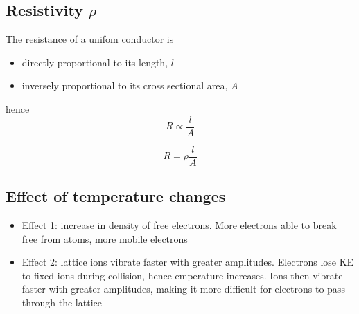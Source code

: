 \documentclass[a4paper, 10pt]{article}
\begin{document}
\subsection{Resistivity $\rho$}
The resistance of a unifom conductor is 
\begin{itemize}
   \item directly proportional to its length, $l$ 
   \item inversely proportional to its cross sectional area, $A$ 
\end{itemize}	

hence \[
R \propto \frac{l}{A}
\]

\[
R = \rho \frac{l}{A}
\]

\subsection{Effect of temperature changes}
\begin{itemize}
   \item Effect 1: increase in density of free electrons. More electrons able to break free from atoms, more mobile electrons
   \item Effect 2: lattice ions vibrate faster with greater amplitudes. Electrons lose KE to fixed ions during collision, hence emperature increases. Ions then vibrate faster with greater amplitudes, making it more difficult for electrons to pass through the lattice
\end{itemize}	
\end{document}
